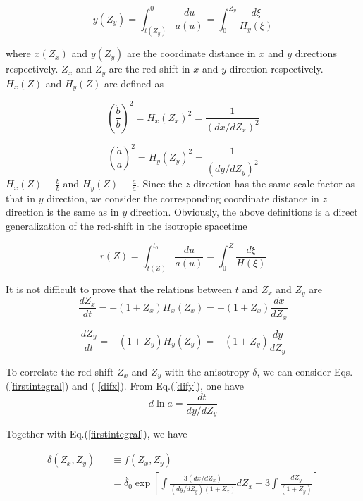 \documentclass[a4paper,preprint]{revtex4}
\begin{document}
\begin{equation}\label{yred}
 y(Z_y)=\int_{t(Z_y)}^0\frac{du}{a(u)}=\int_0^{Z_y}\frac{d\xi}{H_y(\xi)}
\end{equation}

\noindent where $x(Z_x)$ and $y(Z_y)$ are the coordinate distance
in $x$ and $y$ directions respectively. $Z_x$ and $Z_y$ are the
red-shift in $x$ and $y$ direction respectively. $H_x(Z)$ and
$H_y(Z)$ are defined as

\begin{equation}\label{difx}
(\frac{\dot{b}}{b})^2=H_x(Z_x)^2=\frac{1}{(dx/dZ_x)^2}
\end{equation}

\begin{equation}\label{dify}
(\frac{\dot{a}}{a})^2=H_y(Z_y)^2=\frac{1}{(dy/dZ_y)^2}
\end{equation}
$H_x(Z)\equiv\frac{\dot{b}}{b}$ and
$H_y(Z)\equiv\frac{\dot{a}}{a}$. Since the $z$ direction has the
same scale factor as that in $y$ direction, we consider the
corresponding coordinate distance in $z$ direction is the same as
in $y$ direction. Obviously, the above definitions is a direct
generalization of the red-shift in the isotropic spacetime

\begin{equation}\label{rred}
r(Z)=\int^{t_0}_{t(Z)}\frac{du}{a(u)}=\int^Z_0\frac{d\xi}{H(\xi)}
\end{equation}

\noindent It is not difficult to prove that the relations between
$t$ and $Z_x$ and $Z_y$ are
\begin{equation}\label{relationx}
\frac{dZ_x}{dt}=-(1+Z_x)H_x(Z_x)=-(1+Z_x)\frac{dx}{dZ_x}
\end{equation}

\begin{equation}\label{relationy}
\frac{dZ_y}{dt}=-(1+Z_y)H_y(Z_y)=-(1+Z_y)\frac{dy}{dZ_y}
\end{equation}

To correlate the red-shift $Z_x$ and $Z_y$ with the anisotropy
$\delta$, we can consider Eqs.(\ref{firstintegral}) and (
\ref{difx}). From Eq.(\ref{dify}), one have
\begin{equation}\label{intere}
d\ln a=\frac{dt}{dy/dZ_y}
\end{equation}

\noindent Together with Eq.(\ref{firstintegral}), we have

\begin{eqnarray}\label{deltaredshift}
\dot{\delta}(Z_x, Z_y)&&\equiv f(Z_x, Z_y)\\\nonumber
&&=\dot{\delta_0}\exp[\int\frac{3(dx/dZ_x)}{(dy/dZ_y)(1+Z_x)}dZ_x+3\int\frac{dZ_y}{(1+Z_y)}]
\end{eqnarray}
\end{document}
